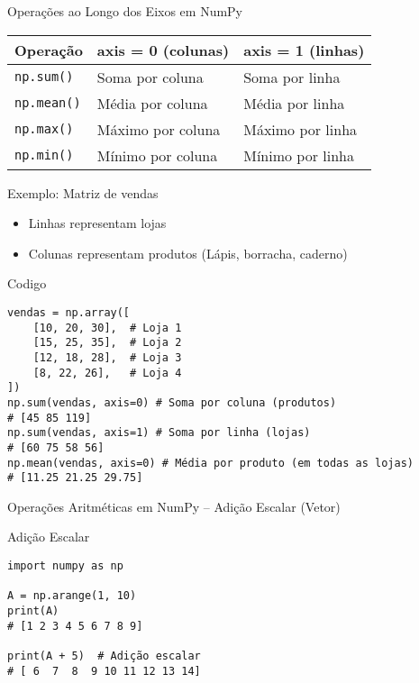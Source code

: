 \begin{frame}{Operações ao Longo dos Eixos em NumPy}

    \centering
    \begin{tabular}{|l|p{5cm}|p{5cm}|}
        \hline
        \textbf{Operação}  & \textbf{axis = 0 (colunas)} & \textbf{axis = 1 (linhas)} \\
        \hline
        \texttt{np.sum()}  & Soma por coluna             & Soma por linha             \\
        \hline
        \texttt{np.mean()} & Média por coluna            & Média por linha            \\
        \hline
        \texttt{np.max()}  & Máximo por coluna           & Máximo por linha           \\
        \hline
        \texttt{np.min()}  & Mínimo por coluna           & Mínimo por linha           \\
        \hline
    \end{tabular}


\end{frame}

\begin{frame}[fragile]{Exemplo: Matriz de vendas}
    \begin{itemize}
        \item Linhas representam lojas
        \item Colunas representam produtos (Lápis, borracha, caderno)
    \end{itemize}
    \begin{block}{Codigo}
        \begin{verbatim}
vendas = np.array([
    [10, 20, 30],  # Loja 1
    [15, 25, 35],  # Loja 2
    [12, 18, 28],  # Loja 3
    [8, 22, 26],   # Loja 4
])
np.sum(vendas, axis=0) # Soma por coluna (produtos)
# [45 85 119]
np.sum(vendas, axis=1) # Soma por linha (lojas)
# [60 75 58 56]
np.mean(vendas, axis=0) # Média por produto (em todas as lojas)
# [11.25 21.25 29.75]
\end{verbatim}
    \end{block}

\end{frame}


\begin{frame}[fragile]{Operações Aritméticas em NumPy – Adição Escalar (Vetor)}
    \begin{block}{Adição Escalar}
        \begin{verbatim}
import numpy as np

A = np.arange(1, 10)
print(A)
# [1 2 3 4 5 6 7 8 9]

print(A + 5)  # Adição escalar
# [ 6  7  8  9 10 11 12 13 14]
\end{verbatim}
    \end{block}
\end{frame}

